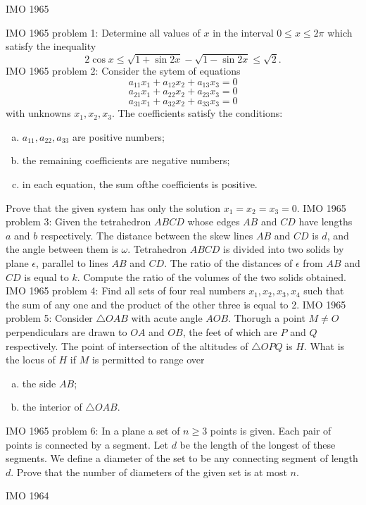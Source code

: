 IMO 1965 

IMO 1965 problem 1:  Determine all values of $x$ in the interval $0 \leq x \leq 2\pi$ which satisfy the inequality
\[ 2 \cos{x} \leq \sqrt{1+\sin{2x}}-\sqrt{1-\sin{2x}} \leq \sqrt{2}. \] 
IMO 1965 problem 2:  Consider the sytem of equations
\[ a_{11}x_1+a_{12}x_2+a_{13}x_3 = 0 \]
\[ a_{21}x_1+a_{22}x_2+a_{23}x_3 =0 \]
\[ a_{31}x_1+a_{32}x_2+a_{33}x_3 = 0 \]
with unknowns $x_1, x_2, x_3$. The coefficients satisfy the conditions:
\begin{enumerate}[a)]
  \item $a_{11}, a_{22}, a_{33}$ are positive numbers;
  \item the remaining coefficients are negative numbers;
  \item in each equation, the sum ofthe coefficients is positive.
\end{enumerate}
Prove that the given system has only the solution $x_1=x_2=x_3=0$. 
IMO 1965 problem 3:  Given the tetrahedron $ABCD$ whose edges $AB$ and $CD$ have lengths $a$ and $b$ respectively. The distance between the skew lines $AB$ and $CD$ is $d$, and the angle between them is $\omega$. Tetrahedron $ABCD$ is divided into two solids by plane $\epsilon$, parallel to lines $AB$ and $CD$. The ratio of the distances of $\epsilon$ from $AB$ and $CD$ is equal to $k$. Compute the ratio of the volumes of the two solids obtained. 
IMO 1965 problem 4:  Find all sets of four real numbers $x_1, x_2, x_3, x_4$ such that the sum of any one and the product of the other three is equal to 2. 
IMO 1965 problem 5:  Consider $\triangle OAB$ with acute angle $AOB$. Thorugh a point $M \neq O$ perpendiculars are drawn to $OA$ and $OB$, the feet of which are $P$ and $Q$ respectively. The point of intersection of the altitudes of $\triangle OPQ$ is $H$. What is the locus of $H$ if $M$ is permitted to range over
\begin{enumerate}[a)]
  \item the side $AB$;
  \item the interior of $\triangle OAB$.
\end{enumerate} 
IMO 1965 problem 6:  In a plane a set of $n\geq 3$ points is given. Each pair of points is connected by a segment. Let $d$ be the length of the longest of these segments. We define a diameter of the set to be any connecting segment of length $d$. Prove that the number of diameters of the given set is at most $n$. 

IMO 1964 

